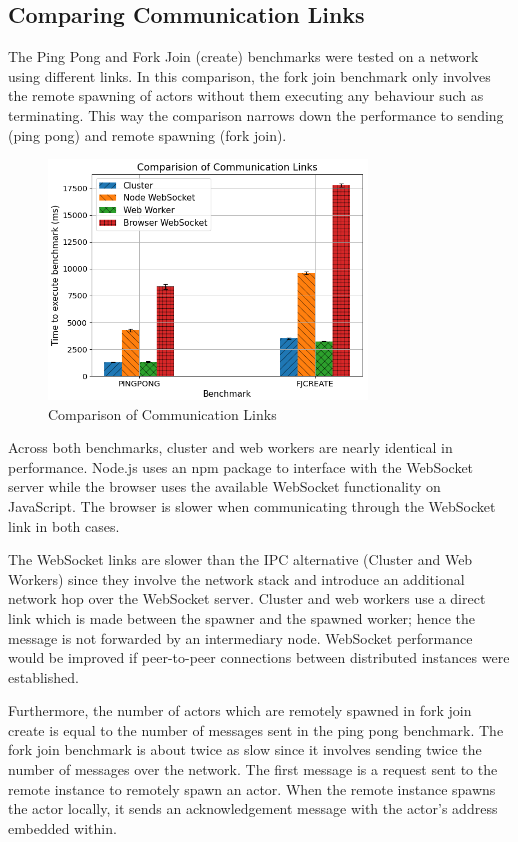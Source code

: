 \documentclass[oneside]{um-fict}
\begin{document}
\subsection{Comparing Communication Links}
The Ping Pong and Fork Join (create) benchmarks were tested on a network using different links. In this comparison, the fork join benchmark only involves the remote spawning of actors without them executing any behaviour such as terminating. This way the comparison narrows down the performance to sending (ping pong) and remote spawning (fork join).
\begin{figure}[H]
    \begin{centering}
        \includegraphics[width=320px]{resources/link.png}
        \caption{Comparison of Communication Links}\label{fig:link}
    \end{centering}
\end{figure}
Across both benchmarks, cluster and web workers are nearly identical in performance. Node.js uses an npm package to interface with the WebSocket server while the browser uses the available WebSocket functionality on JavaScript. The browser is slower when communicating through the WebSocket link in both cases. 

The WebSocket links are slower than the IPC alternative (Cluster and Web Workers) since they involve the network stack and introduce an additional network hop over the WebSocket server. Cluster and web workers use a direct link which is made between the spawner and the spawned worker; hence the message is not forwarded by an intermediary node. WebSocket performance would be improved if peer-to-peer connections between distributed instances were established.

Furthermore, the number of actors which are remotely spawned in fork join create is equal to the number of messages sent in the ping pong benchmark. The fork join benchmark is about twice as slow since it involves sending twice the number of messages over the network. The first message is a request sent to the remote instance to remotely spawn an actor. When the remote instance spawns the actor locally, it sends an acknowledgement message with the actor's address embedded within.
\end{document}
